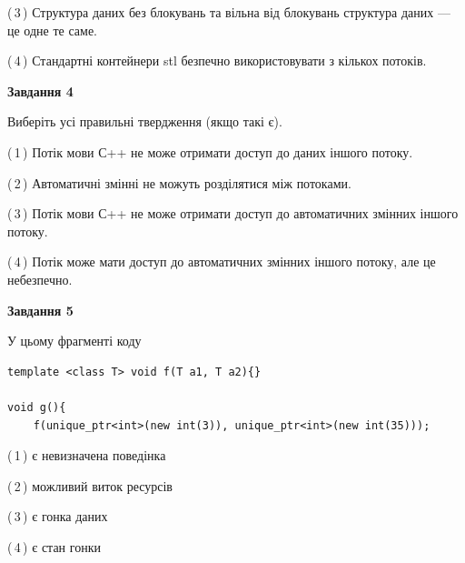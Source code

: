 \documentclass[12pt, ukrainian]{article}
\begin{document}
\begin {large}
{(\,3\,) Структура даних без блокувань та вільна від блокувань структура даних --- це одне те саме.%

(\,4\,) Стандартні контейнери stl безпечно використовувати з кількох потоків.%



\begin{center}
\textbf{Завдання 4}
\end{center}
Виберіть усі правильні твердження (якщо такі є).\par
\vspace{2mm}

(\,1\,) Потік мови С++ не може отримати доступ до даних іншого потоку.%

(\,2\,) Автоматичні змінні не можуть розділятися між потоками.%

(\,3\,) Потік мови С++ не може отримати доступ до автоматичних змінних іншого потоку.%

(\,4\,) Потік може мати доступ до автоматичних змінних іншого потоку, але це небезпечно.%



\begin{center}
\textbf{Завдання 5}
\end{center}
У цьому фрагменті коду
\begin{verbatim}
template <class T> void f(T a1, T a2){}

void g(){
    f(unique_ptr<int>(new int(3)), unique_ptr<int>(new int(35)));
\end{verbatim}

(\,1\,) є невизначена поведінка%

(\,2\,) можливий виток ресурсів%

(\,3\,) є гонка даних%

(\,4\,) є стан гонки%


}
\end {large}
\end{document}
